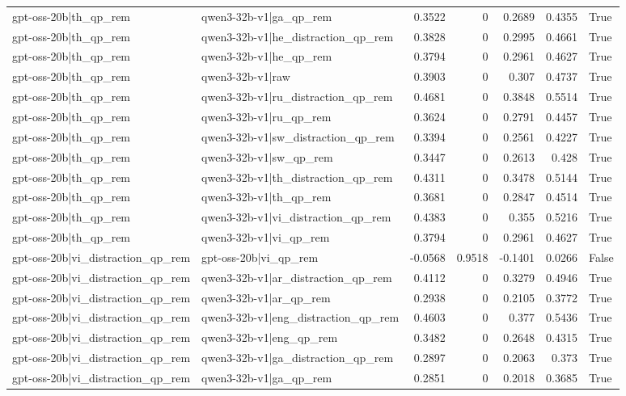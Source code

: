 \begin{table}
\begin{tabular}{l l r r r r l}
gpt-oss-20b|th_qp_rem & qwen3-32b-v1|ga_qp_rem & 0.3522 & 0 & 0.2689 & 0.4355 & True \\
gpt-oss-20b|th_qp_rem & qwen3-32b-v1|he_distraction_qp_rem & 0.3828 & 0 & 0.2995 & 0.4661 & True \\
gpt-oss-20b|th_qp_rem & qwen3-32b-v1|he_qp_rem & 0.3794 & 0 & 0.2961 & 0.4627 & True \\
gpt-oss-20b|th_qp_rem & qwen3-32b-v1|raw & 0.3903 & 0 & 0.307 & 0.4737 & True \\
gpt-oss-20b|th_qp_rem & qwen3-32b-v1|ru_distraction_qp_rem & 0.4681 & 0 & 0.3848 & 0.5514 & True \\
gpt-oss-20b|th_qp_rem & qwen3-32b-v1|ru_qp_rem & 0.3624 & 0 & 0.2791 & 0.4457 & True \\
gpt-oss-20b|th_qp_rem & qwen3-32b-v1|sw_distraction_qp_rem & 0.3394 & 0 & 0.2561 & 0.4227 & True \\
gpt-oss-20b|th_qp_rem & qwen3-32b-v1|sw_qp_rem & 0.3447 & 0 & 0.2613 & 0.428 & True \\
gpt-oss-20b|th_qp_rem & qwen3-32b-v1|th_distraction_qp_rem & 0.4311 & 0 & 0.3478 & 0.5144 & True \\
gpt-oss-20b|th_qp_rem & qwen3-32b-v1|th_qp_rem & 0.3681 & 0 & 0.2847 & 0.4514 & True \\
gpt-oss-20b|th_qp_rem & qwen3-32b-v1|vi_distraction_qp_rem & 0.4383 & 0 & 0.355 & 0.5216 & True \\
gpt-oss-20b|th_qp_rem & qwen3-32b-v1|vi_qp_rem & 0.3794 & 0 & 0.2961 & 0.4627 & True \\
gpt-oss-20b|vi_distraction_qp_rem & gpt-oss-20b|vi_qp_rem & -0.0568 & 0.9518 & -0.1401 & 0.0266 & False \\
gpt-oss-20b|vi_distraction_qp_rem & qwen3-32b-v1|ar_distraction_qp_rem & 0.4112 & 0 & 0.3279 & 0.4946 & True \\
gpt-oss-20b|vi_distraction_qp_rem & qwen3-32b-v1|ar_qp_rem & 0.2938 & 0 & 0.2105 & 0.3772 & True \\
gpt-oss-20b|vi_distraction_qp_rem & qwen3-32b-v1|eng_distraction_qp_rem & 0.4603 & 0 & 0.377 & 0.5436 & True \\
gpt-oss-20b|vi_distraction_qp_rem & qwen3-32b-v1|eng_qp_rem & 0.3482 & 0 & 0.2648 & 0.4315 & True \\
gpt-oss-20b|vi_distraction_qp_rem & qwen3-32b-v1|ga_distraction_qp_rem & 0.2897 & 0 & 0.2063 & 0.373 & True \\
gpt-oss-20b|vi_distraction_qp_rem & qwen3-32b-v1|ga_qp_rem & 0.2851 & 0 & 0.2018 & 0.3685 & True \\

\end{tabular}
\end{table}
